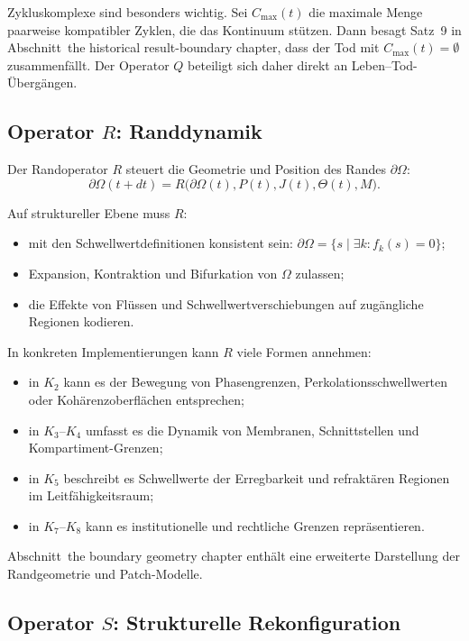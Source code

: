 Zykluskomplexe sind besonders wichtig. Sei \(C_{\max}(t)\) die maximale Menge
paarweise kompatibler Zyklen, die das Kontinuum stützen. Dann besagt Satz~9 in
Abschnitt~the historical result-boundary chapter, dass der Tod mit \(C_{\max}(t) = \emptyset\)
zusammenfällt. Der Operator \(Q\) beteiligt sich daher direkt an
Leben--Tod-Übergängen.

\subsection{Operator \texorpdfstring{\texorpdfstring{$R$}{R}}{R}: Randdynamik}

Der Randoperator \(R\) steuert die Geometrie und Position des Randes
\(\partial\Omega\):
\[
  \partial\Omega(t+dt) =
    R\big(\partial\Omega(t), P(t), J(t), \Theta(t), M\big).
\]

Auf struktureller Ebene muss \(R\):
\begin{itemize}
  \item mit den Schwellwertdefinitionen konsistent sein:
        \(\partial\Omega = \{ s \mid \exists k: f_k(s) = 0 \}\);
  \item Expansion, Kontraktion und Bifurkation von \(\Omega\) zulassen;
  \item die Effekte von Flüssen und Schwellwertverschiebungen auf
        zugängliche Regionen kodieren.
\end{itemize}

In konkreten Implementierungen kann \(R\) viele Formen annehmen:
\begin{itemize}
  \item in \(K_2\) kann es der Bewegung von Phasengrenzen,
        Perkolationsschwellwerten oder Kohärenzoberflächen entsprechen;
  \item in \(K_3\)–\(K_4\) umfasst es die Dynamik von Membranen,
        Schnittstellen und Kompartiment-Grenzen;
  \item in \(K_5\) beschreibt es Schwellwerte der Erregbarkeit und
        refraktären Regionen im Leitfähigkeitsraum;
  \item in \(K_7\)–\(K_8\) kann es institutionelle und rechtliche
        Grenzen repräsentieren.
\end{itemize}

Abschnitt~the boundary geometry chapter enthält eine erweiterte Darstellung der
Randgeometrie und Patch-Modelle.

\subsection{Operator \texorpdfstring{\texorpdfstring{$S$}{S}}{S}: Strukturelle
Rekonfiguration}

